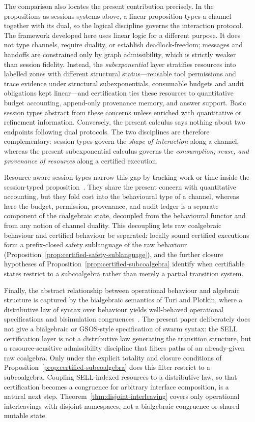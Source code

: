\documentclass[a4paper,fleqn]{cas-sc}
\begin{document}
The comparison also locates the present contribution precisely. In the propositions-as-sessions systems above, a linear proposition types a channel together with its dual, so the logical discipline governs the interaction protocol. The framework developed here uses linear logic for a different purpose. It does not type channels, require duality, or establish deadlock-freedom; messages and handoffs are constrained only by graph admissibility, which is strictly weaker than session fidelity. Instead, the \emph{subexponential} layer stratifies resources into labelled zones with different structural status---reusable tool permissions and trace evidence under structural subexponentials, consumable budgets and audit obligations kept linear---and certification ties these resources to quantitative budget accounting, append-only provenance memory, and answer support. Basic session types abstract from these concerns unless enriched with quantitative or refinement information. Conversely, the present calculus says nothing about two endpoints following dual protocols. The two disciplines are therefore complementary: session types govern the \emph{shape of interaction} along a channel, whereas the present subexponential calculus governs the \emph{consumption, reuse, and provenance of resources} along a certified execution.

Resource-aware session types narrow this gap by tracking work or time inside the session-typed proposition~\cite{das2018}. They share the present concern with quantitative accounting, but they fold cost into the behavioural type of a channel, whereas here the budget, permission, provenance, and audit ledger is a separate component of the coalgebraic state, decoupled from the behavioural functor and from any notion of channel duality. This decoupling lets raw coalgebraic behaviour and certified behaviour be separated: locally sound certified executions form a prefix-closed safety sublanguage of the raw behaviour (Proposition~\ref{prop:certified-safety-sublanguage}), and the further closure hypotheses of Proposition~\ref{prop:certified-subcoalgebra} identify when certifiable states restrict to a subcoalgebra rather than merely a partial transition system.

Finally, the abstract relationship between operational behaviour and algebraic structure is captured by the bialgebraic semantics of Turi and Plotkin, where a distributive law of syntax over behaviour yields well-behaved operational specifications and bisimulation congruences~\cite{turi1997}. The present paper deliberately does not give a bialgebraic or GSOS-style specification of swarm syntax: the SELL certification layer is not a distributive law generating the transition structure, but a resource-sensitive admissibility discipline that filters paths of an already-given raw coalgebra. Only under the explicit totality and closure conditions of Proposition~\ref{prop:certified-subcoalgebra} does this filter restrict to a subcoalgebra. Coupling SELL-indexed resources to a distributive law, so that certification becomes a congruence for arbitrary interface composition, is a natural next step. Theorem~\ref{thm:disjoint-interleaving} covers only operational interleavings with disjoint namespaces, not a bialgebraic congruence or shared mutable state.
\end{document}
